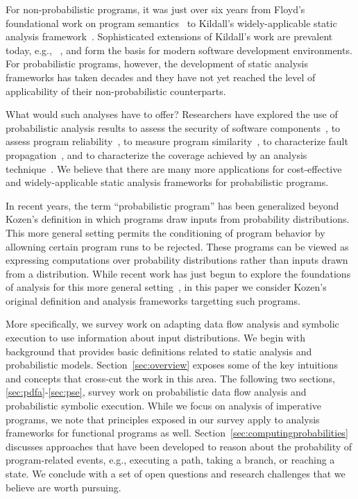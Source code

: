 For non-probabilistic programs, it was just over six years
from Floyd's foundational work on program semantics~\cite{FLOYD67} 
to Kildall's widely-applicable static analysis framework~\cite{kildall1973unified}.
Sophisticated extensions of Kildall's work are prevalent 
today, e.g., ~\cite{lam11:_soot_java,Lattner:2004:LLVM}, and form 
the basis for modern software development environments.
For probabilistic programs, however, the development of 
static analysis frameworks has taken decades and 
they have not yet reached the level of applicability of 
their non-probabilistic counterparts.

What would such analyses have to offer?
Researchers have explored the use of probabilistic analysis
results to assess the security of software components~\cite{mardziel2013dynamic},
to assess program reliability~\cite{Filieri2013}, to measure program
similarity~\cite{Geldenhuys2012}, 
to characterize fault propagation~\cite{RiskAwareTransformation},
and to characterize the coverage
achieved by an analysis technique~\cite{DwyerASE11}.
We believe that there are many more applications for cost-effective
and widely-applicable static analysis frameworks for probabilistic
programs.

In recent years, the term ``probabilistic program'' has been generalized 
beyond Kozen's definition in which programs draw inputs from probability 
distributions.
This more general setting permits the conditioning of program behavior by
allowning certain program runs to be rejected.  
These programs can be viewed as expressing computations over 
probability distributions rather than inputs drawn from a distribution.  
While recent work has just begun to explore the foundations of analysis for
this more general setting~\cite{claret2013bayesian,Gordon2014}, 
in this paper we consider
Kozen's original definition and analysis frameworks targetting such programs.

More specifically, we survey work on adapting data flow analysis 
and symbolic execution to use information about input distributions.
We begin with background that provides basic definitions
related to static analysis and probabilistic models.
Section~\ref{sec:overview} exposes some of the key
intuitions and concepts that cross-cut the work in this area.
The following two sections, \ref{sec:pdfa}-\ref{sec:pse}, 
survey work on probabilistic data flow analysis and probabilistic
symbolic execution.  
While we focus on analysis of imperative programs, we note that
principles exposed in our survey apply to analysis frameworks 
for functional programs as well.
Section~\ref{sec:computingprobabilities} discusses approaches that
have been developed to reason about the probability of program-related 
events, e.g., executing a path, taking a branch, or reaching a state.
We conclude with a set of open questions
and research challenges that we believe are worth pursuing.

